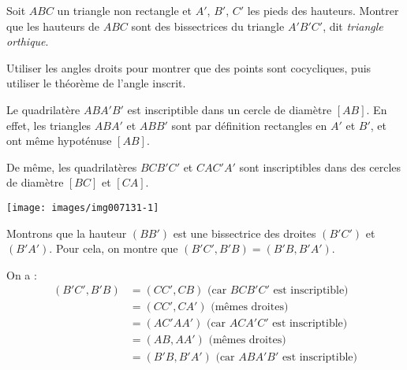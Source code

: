 \begin{exo}%
Soit $ABC$ un triangle non rectangle et $A'$, $B'$, $C'$ les pieds des hauteurs. Montrer que les hauteurs de $ABC$ sont des bissectrices du triangle $A'B'C'$, dit \emph{triangle orthique}. 

\begin{hint}   
Utiliser les angles droits pour montrer que des points sont cocycliques, puis utiliser le théorème de l'angle inscrit.
\end{hint}      
\begin{sol}

Le quadrilatère $ABA'B'$ est inscriptible dans un cercle de diamètre $[AB]$. En effet, les triangles $ABA'$ et $ABB'$ sont par définition rectangles en $A'$ et $B'$, et ont même hypoténuse $[AB]$.

De même, les quadrilatères $BCB'C'$ et $CAC'A'$ sont inscriptibles dans des cercles de diamètre $[BC]$ et $[CA]$.

\begin{center}
\texttt{[image: images/img007131-1]}
\end{center}

Montrons que la hauteur $(BB')$ est une bissectrice des droites $(B'C')$ et $(B'A')$. Pour cela, on montre que $(B'C',B'B)=(B'B,B'A')$.

On a :
\begin{align*}
(B'C',B'B)
&= (CC',CB) \text{ (car $BCB'C'$ est inscriptible)}\\
&= (CC',CA') \text{ (mêmes droites)}\\
&= (AC'AA') \text{ (car $ACA'C'$ est inscriptible)}\\
&= (AB,AA') \text{ (mêmes droites)}\\
&= (B'B,B'A') \text{ (car $ABA'B'$ est inscriptible)}\\
\end{align*}

\end{sol}  
\end{exo}  



